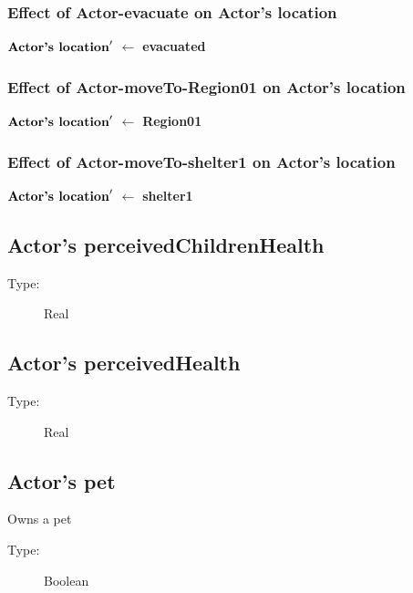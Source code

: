 \documentclass{article}%
\begin{document}
%
\subsubsection{Effect of Actor{-}evacuate on Actor's location}%
\label{ssubsec:Effect of Actor{-}evacuate on Actor's location}%
\begin{flushleft}%
$\mbox{\textbf{Actor's location}} '$%
$\leftarrow$%
\textbf{evacuated}%
\end{flushleft}

%
\subsubsection{Effect of Actor{-}moveTo{-}Region01 on Actor's location}%
\label{ssubsec:Effect of Actor{-}moveTo{-}Region01 on Actor's location}%
\begin{flushleft}%
$\mbox{\textbf{Actor's location}} '$%
$\leftarrow$%
\textbf{Region01}%
\end{flushleft}

%
\subsubsection{Effect of Actor{-}moveTo{-}shelter1 on Actor's location}%
\label{ssubsec:Effect of Actor{-}moveTo{-}shelter1 on Actor's location}%
\begin{flushleft}%
$\mbox{\textbf{Actor's location}} '$%
$\leftarrow$%
\textbf{shelter1}%
\end{flushleft}

%
\subsection{Actor's perceivedChildrenHealth}%
\label{subsec:Actor's perceivedChildrenHealth}%
\begin{description}%
\item[Type:]%
Real%
\end{description}

%
\subsection{Actor's perceivedHealth}%
\label{subsec:Actor's perceivedHealth}%
\begin{description}%
\item[Type:]%
Real%
\end{description}

%
\subsection{Actor's pet}%
\label{subsec:Actor's pet}%
Owns a pet%
\begin{description}%
\item[Type:]%
Boolean%
\end{description}
\end{document}
